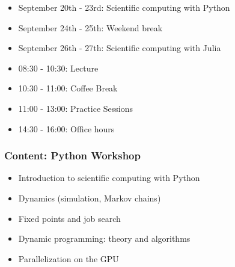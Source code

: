 \begin{frame}


    \begin{itemize}
        \item September 20th - 23rd: Scientific computing with Python
        \item September 24th - 25th: Weekend break
        \item September 26th - 27th: Scientific computing with Julia
    \end{itemize}

        \vspace{0.5em}
        \vspace{0.5em}

    \begin{itemize}
        \item 08:30 - 10:30: Lecture
        \item 10:30 - 11:00: Coffee Break
        \item 11:00 - 13:00: Practice Sessions
        \item 14:30 - 16:00: Office hours
    \end{itemize}

\end{frame}


\begin{frame}
    \frametitle{Content: Python Workshop}


    \begin{itemize}
        \item Introduction to scientific computing with Python
        \vspace{0.5em}
        \vspace{0.5em}
        \item Dynamics (simulation, Markov chains)
        \vspace{0.5em}
        \vspace{0.5em}
        \item Fixed points and job search 
        \vspace{0.5em}
        \vspace{0.5em}
        \item Dynamic programming: theory and algorithms
        \vspace{0.5em}
        \vspace{0.5em}
        \item Parallelization on the GPU 
    \end{itemize}

\end{frame}




